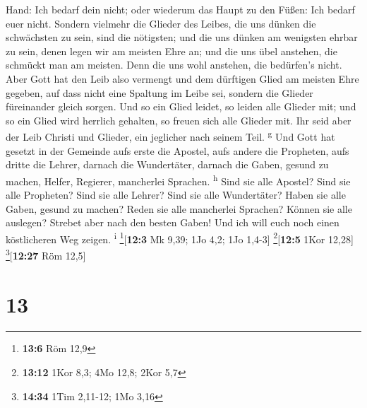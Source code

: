 Hand: Ich bedarf dein nicht; oder wiederum das Haupt zu den Füßen: Ich
bedarf euer nicht.  Sondern vielmehr die Glieder des
Leibes, die uns dünken die schwächsten zu sein, sind die nötigsten;
 und die uns dünken am wenigsten ehrbar zu sein, denen
legen wir am meisten Ehre an; und die uns übel anstehen, die schmückt
man am meisten.  Denn die uns wohl anstehen, die
bedürfen's nicht. Aber Gott hat den Leib also vermengt und dem dürftigen
Glied am meisten Ehre gegeben,  auf dass nicht eine
Spaltung im Leibe sei, sondern die Glieder füreinander gleich sorgen.
 Und so ein Glied leidet, so leiden alle Glieder mit; und
so ein Glied wird herrlich gehalten, so freuen sich alle Glieder mit.
 Ihr seid aber der Leib Christi und Glieder, ein
jeglicher nach seinem Teil. \textsuperscript{g}  Und Gott
hat gesetzt in der Gemeinde aufs erste die Apostel, aufs andere die
Propheten, aufs dritte die Lehrer, darnach die Wundertäter, darnach die
Gaben, gesund zu machen, Helfer, Regierer, mancherlei Sprachen.
\textsuperscript{h}  Sind sie alle Apostel? Sind sie alle
Propheten? Sind sie alle Lehrer? Sind sie alle Wundertäter?
 Haben sie alle Gaben, gesund zu machen? Reden sie alle
mancherlei Sprachen? Können sie alle auslegen?  Strebet
aber nach den besten Gaben! Und ich will euch noch einen köstlicheren
Weg zeigen. \textsuperscript{i} \footnote{\textbf{13:6} Röm 12,9}{[}\textbf{12:3}
Mk 9,39; 1Jo 4,2; 1Jo 1,4-3{]} \footnote{\textbf{13:12} 1Kor 8,3; 4Mo
  12,8; 2Kor 5,7}{[}\textbf{12:5} 1Kor 12,28{]}
\footnote{\textbf{14:34} 1Tim 2,11-12; 1Mo 3,16}{[}\textbf{12:27} Röm
12,5{]}

\hypertarget{section-12}{%
\section{13}\label{section-12}}

